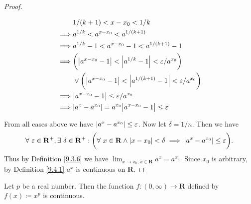 \begin{proof}
\begin{enumerate}
              \begin{align*}
                           & 1 / (k + 1) < x - x_0 < 1 / k                                                                \\
                  \implies & a^{1 / k} < a^{x - x_0} < a^{1 / (k + 1)}                                                    \\
                  \implies & a^{1 / k} - 1 < a^{x - x_0} - 1 < a^{1 / (k + 1)} - 1                                        \\
                  \implies & \bigg(\abs*{a^{x - x_0} - 1} < \abs*{a^{1 / k} - 1} < \varepsilon / a^{x_0}\bigg)            \\
                           & \lor \bigg(\abs*{a^{x - x_0} - 1} < \abs*{a^{1 / (k + 1)} - 1} < \varepsilon / a^{x_0}\bigg) \\
                  \implies & \abs*{a^{x - x_0} - 1} \leq \varepsilon / a^{x_0}                                            \\
                  \implies & \abs*{a^x - a^{x_0}} = a^{x_0} \abs*{a^{x - x_0} - 1} \leq \varepsilon                       \\
              \end{align*}
    \end{enumerate}
    From all cases above we have \(\abs*{a^x - a^{x_0}} \leq \varepsilon\).
    Now let \(\delta = 1 / n\).
    Then we have
    \[
        \forall\ \varepsilon \in \mathbf{R}^+, \exists\ \delta \in \mathbf{R}^+ : \bigg(\forall\ x \in \mathbf{R} \land \abs*{x - x_0} < \delta \implies \abs*{a^x - a^{x_0}} \leq \varepsilon\bigg).
    \]
    Thus by Definition \ref{9.3.6} we have \(\lim_{x \to x_0 ; x \in \mathbf{R}} a^x = a^{x_0}\).
    Since \(x_0\) is arbitrary, by Definition \ref{9.4.1} \(a^x\) is continuous on \(\mathbf{R}\).
\end{proof}

\begin{proposition}\label{9.4.11}
    Let \(p\) be a real number.
    Then the function \(f : (0, \infty) \to \mathbf{R}\) defined by \(f(x) \coloneqq x^p\) is continuous.
\end{proposition}

